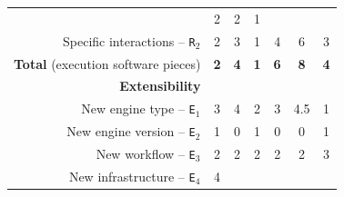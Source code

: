 \documentclass[preprint,3p,twocolumn]{elsarticle}
\begin{document}
\begin{table}
\begin{tabular}{rcccccc}
                                     & \cellcolor[HTML]{999999}2
                                     & \cellcolor[HTML]{999999}2
                                     & \cellcolor[HTML]{99CC99}1\\
  Specific interactions -- \texttt{R$_2$} & \cellcolor[HTML]{99EB99}2
                                     & \cellcolor[HTML]{99D699}3
                                     & \cellcolor[HTML]{99FF99}1
                                     & \cellcolor[HTML]{99C299}4
                                     & \cellcolor[HTML]{999999}6
                                     & \cellcolor[HTML]{99D699}3\\
  \textbf{Total} (execution software pieces)& \cellcolor[HTML]{99F099}\textbf{2}
                                     & \cellcolor[HTML]{99D399}\textbf{4}
                                     & \cellcolor[HTML]{99FF99}\textbf{1}
                                     & \cellcolor[HTML]{99B699}\textbf{6}
                                     & \cellcolor[HTML]{999999}\textbf{8}
                                     & \cellcolor[HTML]{99D399}\textbf{4}\\
\cellcolor[HTML]{EEEEEE}\textbf{Extensibility}& \multicolumn{6}{l}{\cellcolor[HTML]{EEEEEE}}\\
  New engine type -- \texttt{E$_1$}  & \cellcolor[HTML]{99C599}3
                                     & \cellcolor[HTML]{99A899}4
                                     & \cellcolor[HTML]{99E299}2
                                     & \cellcolor[HTML]{99C599}3
                                     & \cellcolor[HTML]{999999}4.5
                                     & \cellcolor[HTML]{99FF99}1\\
New engine version -- \texttt{E$_2$} & \cellcolor[HTML]{999999}1
                                     & \cellcolor[HTML]{99FF99}0
                                     & \cellcolor[HTML]{999999}1
                                     & \cellcolor[HTML]{99FF99}0
                                     & \cellcolor[HTML]{99FF99}0
                                     & \cellcolor[HTML]{999999}1\\
  New workflow -- \texttt{E$_3$} & \cellcolor[HTML]{99FF99}2
                                     & \cellcolor[HTML]{99FF99}2
                                     & \cellcolor[HTML]{99FF99}2
                                     & \cellcolor[HTML]{99FF99}2
                                     & \cellcolor[HTML]{99FF99}2
                                     & \cellcolor[HTML]{999999}3\\
New infrastructure -- \texttt{E$_4$} & \cellcolor[HTML]{99DD99}4

\end{tabular}
\end{table}
\end{document}
